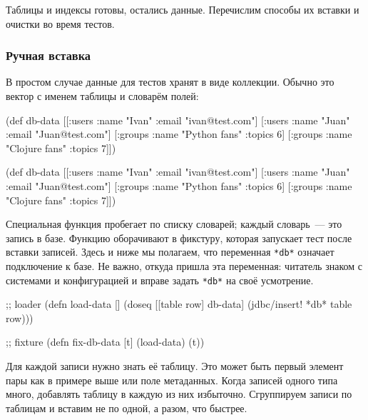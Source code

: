 Таблицы и индексы готовы, остались данные. Перечислим способы их вставки и
очистки во время тестов.

\subsubsection*{Ручная вставка}

В простом случае данные для тестов хранят в виде коллекции. Обычно это вектор с
именем таблицы и словарём полей:

\ifnarrow

\begin{english}
  \begin{clojure}
(def db-data
 [[:users {:name "Ivan"
           :email "ivan@test.com"}]
  [:users {:name "Juan"
           :email "Juan@test.com"}]
  [:groups {:name "Python fans"
            :topics 6}]
  [:groups {:name "Clojure fans"
            :topics 7}]])
  \end{clojure}
\end{english}

\else

\begin{english}
  \begin{clojure}
(def db-data
  [[:users {:name "Ivan" :email "ivan@test.com"}]
   [:users {:name "Juan" :email "Juan@test.com"}]
   [:groups {:name "Python fans" :topics 6}]
   [:groups {:name "Clojure fans" :topics 7}]])
  \end{clojure}
\end{english}

\fi


Специальная функция пробегает по списку словарей; каждый словарь~--- это запись
в базе. Функцию оборачивают в фикстуру, которая запускает тест после вставки
записей. Здесь и ниже мы полагаем, что переменная \verb|*db*| означает
подключение к базе. Не важно, откуда пришла эта переменная: читатель знаком с
системами и конфигурацией и вправе задать \verb|*db*| на своё усмотрение.

\begin{english}
  \begin{clojure}
;; loader
(defn load-data []
  (doseq [[table row] db-data]
    (jdbc/insert! *db* table row)))

;; fixture
(defn fix-db-data [t]
  (load-data)
  (t))
  \end{clojure}
\end{english}

Для каждой записи нужно знать её таблицу. Это может быть первый элемент пары
 как в примере выше или поле метаданных. Когда записей
одного типа много, добавлять таблицу в каждую из них избыточно. Сгруппируем
записи по таблицам и вставим не по одной, а разом, что быстрее.

